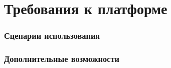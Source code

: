 \section{Требования к платформе}

\subsubsection{Сценарии использования}

\subsubsection{Дополнительные возможности}

\pagebreak

